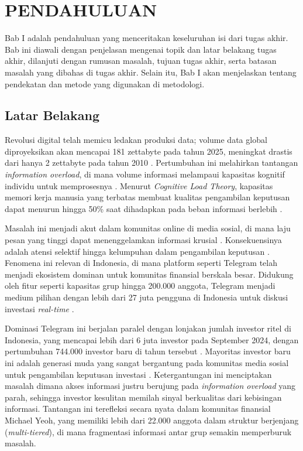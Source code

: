 \chapter{PENDAHULUAN}
\label{chap:pendahuluan}

Bab I adalah pendahuluan yang menceritakan keseluruhan isi dari tugas akhir. Bab ini diawali dengan penjelasan mengenai topik dan latar belakang tugas akhir, dilanjuti dengan rumusan masalah, tujuan tugas akhir, serta batasan masalah yang dibahas di tugas akhir. Selain itu, Bab I akan menjelaskan tentang pendekatan dan metode yang digunakan di metodologi.

\section{Latar Belakang}
Revolusi digital telah memicu ledakan produksi data; volume data global diproyeksikan akan mencapai 181 zettabyte pada tahun 2025, meningkat drastis dari hanya 2 zettabyte pada tahun 2010 \autocite{idc2025}. Pertumbuhan ini melahirkan tantangan \textit{information overload}, di mana volume informasi melampaui kapasitas kognitif individu untuk memprosesnya \autocite{eppler2004}. Menurut \textit{Cognitive Load Theory}, kapasitas memori kerja manusia yang terbatas membuat kualitas pengambilan keputusan dapat menurun hingga 50\% saat dihadapkan pada beban informasi berlebih \autocite{sweller1988,arnold2023}.

Masalah ini menjadi akut dalam komunitas online di media sosial, di mana laju pesan yang tinggi dapat menenggelamkan informasi krusial \autocite{nematzadeh2019}. Konsekuensinya adalah atensi selektif hingga kelumpuhan dalam pengambilan keputusan \autocite{edmunds2000}. Fenomena ini relevan di Indonesia, di mana platform seperti Telegram telah menjadi ekosistem dominan untuk komunitas finansial berskala besar. Didukung oleh fitur seperti kapasitas grup hingga 200.000 anggota, Telegram menjadi medium pilihan dengan lebih dari 27 juta pengguna di Indonesia untuk diskusi investasi \textit{real-time} \autocite{statista2024,perlo2025}.

Dominasi Telegram ini berjalan paralel dengan lonjakan jumlah investor ritel di Indonesia, yang mencapai lebih dari 6 juta investor pada September 2024, dengan pertumbuhan 744.000 investor baru di tahun tersebut \autocite{bei2024}. Mayoritas investor baru ini adalah generasi muda yang sangat bergantung pada komunitas media sosial untuk pengambilan keputusan investasi \autocite{ojk2022,jema2023}. Ketergantungan ini menciptakan masalah dimana akses informasi justru berujung pada \textit{information overload} yang parah, sehingga investor kesulitan memilah sinyal berkualitas dari kebisingan informasi. Tantangan ini terefleksi secara nyata dalam komunitas finansial Michael Yeoh, yang memiliki lebih dari 22.000 anggota dalam struktur berjenjang (\textit{multi-tiered}), di mana fragmentasi informasi antar grup semakin memperburuk masalah.

